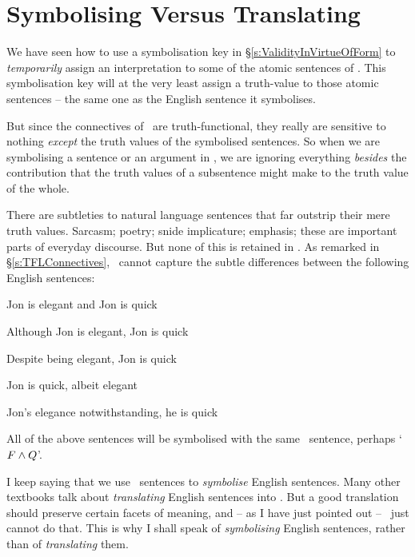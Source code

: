 \section{Symbolising Versus Translating} \label{sec:symvstrans}


We have seen how to use a symbolisation key in §\ref{s:ValidityInVirtueOfForm} to \emph{temporarily} assign an interpretation to some of the atomic sentences of \TFL. This symbolisation key will at the very least assign a truth-value to those atomic sentences – the same one as the English sentence it symbolises.


But since the connectives of \TFL\ are truth-functional, they really are sensitive to nothing \emph{except} the truth values of the symbolised sentences. So when we are symbolising a sentence or an argument in \TFL, we  are ignoring everything \emph{besides} the contribution that the truth values of a subsentence might make to the truth value of the whole. 

There are subtleties to natural language sentences that far outstrip their mere truth values. Sarcasm; poetry; snide implicature; emphasis; these are important parts of everyday discourse. But none of this is retained in \TFL. As remarked in §\ref{s:TFLConnectives}, \TFL\ cannot capture the subtle differences between the following English sentences:
	\begin{earg}
		\item Jon is elegant and Jon is quick
		\item Although Jon is elegant, Jon is quick
		\item Despite being elegant, Jon is quick
		\item Jon is quick, albeit elegant
		\item Jon's elegance notwithstanding, he is quick
	\end{earg}
All of the above sentences will be symbolised with the same \TFL\ sentence, perhaps `$F \wedge Q$'.

I keep saying that we use \TFL\ sentences to \emph{symbolise} English sentences. Many other textbooks talk about \emph{translating} English sentences into \TFL. But a good translation should preserve certain facets of meaning, and – as I have just pointed out – \TFL\ just cannot do that. This is why I shall speak of \emph{symbolising} English sentences, rather than of \emph{translating} them.

